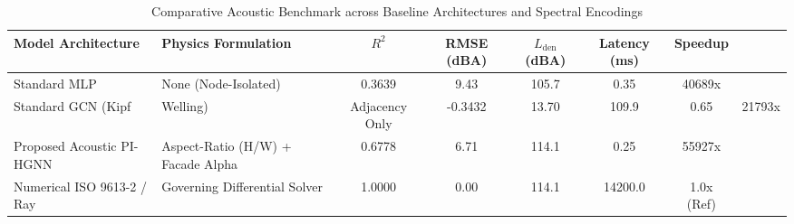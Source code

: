 \begin{table}[t]
\centering
\caption{Comparative Acoustic Benchmark across Baseline Architectures and Spectral Encodings}
\label{tab:acoustic_benchmark}
\begin{tabular}{llccccc}
\hline
\textbf{Model Architecture} & \textbf{Physics Formulation} & \textbf{$R^2$} & \textbf{RMSE (dBA)} & \textbf{$L_{\mathrm{den}}$ (dBA)} & \textbf{Latency (ms)} & \textbf{Speedup} \\
\hline
Standard MLP & None (Node-Isolated) & 0.3639 & 9.43 & 105.7 & 0.35 & 40689x \\
Standard GCN (Kipf & Welling) & Adjacency Only & -0.3432 & 13.70 & 109.9 & 0.65 & 21793x \\
Proposed Acoustic PI-HGNN & Aspect-Ratio (H/W) + Facade Alpha & 0.6778 & 6.71 & 114.1 & 0.25 & 55927x \\
Numerical ISO 9613-2 / Ray & Governing Differential Solver & 1.0000 & 0.00 & 114.1 & 14200.0 & 1.0x (Ref) \\
\hline
\end{tabular}
\end{table}
